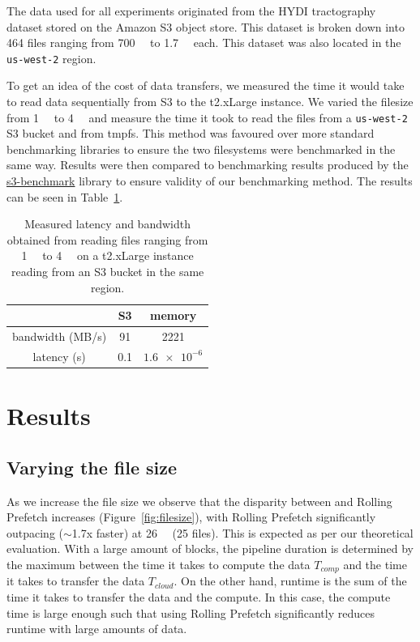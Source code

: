 \documentclass[conference]{IEEEtran}
\begin{document}
The data used for all experiments originated from the HYDI tractography dataset stored on the Amazon S3 object store. 
This dataset is broken down into 464 files ranging from \SI{700}{\mebi\byte} to \SI{1.7}{\gibi\byte} each. This dataset
was also located in the \texttt{us-west-2} region.

To get an idea of the cost of data transfers, we measured the time it would take to read data sequentially from S3 to the t2.xLarge instance. We varied the filesize from \SI{1}{\kibi\byte} to \SI{4}{\gibi\byte} and measure the time it took to read the files from
a \texttt{us-west-2} S3 bucket and from tmpfs. This method was favoured over more standard benchmarking libraries to ensure the
two filesystems were benchmarked in the same way. Results were then compared to benchmarking results produced by
the \href{https://github.com/dvassallo/s3-benchmark}{s3-benchmark} library to ensure validity of our benchmarking
method. The results can be seen in Table~\ref{table:benchmarks}.


\begin{table}
\caption{Measured latency and bandwidth obtained from reading files ranging from \SI{1}{\kibi\byte} to \SI{4}{\gibi\byte} on a t2.xLarge instance reading from an S3 bucket in the same region.}
\centering
\begin{tabular}{| c | c | c| }
\cline{2-3}
  \multicolumn{1}{c|}{}& S3 & memory \\ 
  \hline
 bandwidth (MB/s) & 91 & 2221 \\  
 latency (s) & 0.1 & $\num{1.6e-6}$ \\
 \hline
\end{tabular}

\label{table:benchmarks}
\end{table}


\section{Results}
\subsection{Varying the file size}
As we increase the file size we observe that the disparity between \sfs and
Rolling Prefetch increases (Figure~\ref{fig:filesize}), with Rolling Prefetch significantly outpacing ($\sim$1.7x faster) 
\sfs at \SI{26}{\gibi\byte} (25 files). This is expected as per our theoretical evaluation. With a large amount of blocks, the pipeline duration is determined by the maximum between the time it takes to
compute the data $T_{comp}$ and the time it takes to transfer the data $T_{cloud}$. On the other hand, \sfs runtime is the sum of the time it takes to transfer the data and the compute. In this case, the compute time is large enough such that using Rolling Prefetch significantly reduces runtime with large amounts of data.
\end{document}
